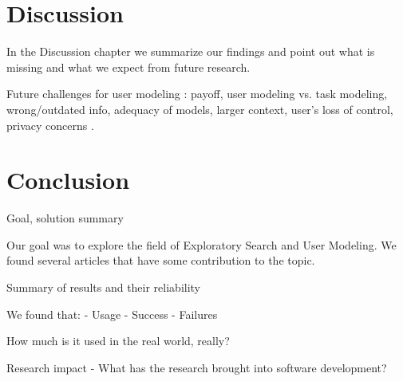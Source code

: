 \documentclass{sigchi}
\begin{document}
\section{Discussion}
In the Discussion chapter we summarize our findings and point out what is missing and what we expect from future research. 

Future challenges for user modeling : payoff, user modeling vs. task modeling, wrong/outdated info, adequacy of models, larger context, user's loss of control, privacy concerns \cite{fischer01}.

\section{Conclusion}
Goal, solution summary

Our goal was to explore the field of Exploratory Search and User Modeling. We found several articles that have some contribution to the topic.

Summary of results and their reliability 

We found that:
- Usage
- Success
- Failures

How much is it used in the real world, really?

Research impact
- What has the research brought into software development?

\nocite{*} %

%
%
%
%
%
\balance



\end{document}
